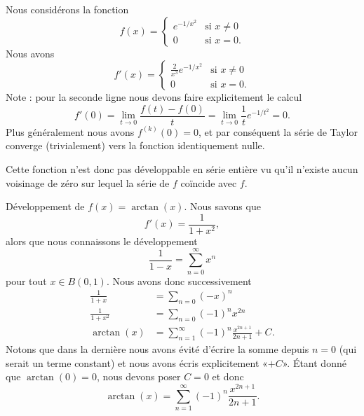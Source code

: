 \begin{example}
    Nous considérons la fonction
    \begin{equation}
        f(x)=\begin{cases}
            e^{-1/x^2}    &   \text{si } x\neq 0\\
            0    &    \text{si } x=0\text{.}
        \end{cases}
    \end{equation}
    Nous avons
    \begin{equation}
        f'(x)=\begin{cases}
            \frac{ 2 }{ x^3 } e^{-1/x^2}    &   \text{si } x\neq 0\\
            0    &    \text{si } x=0.
        \end{cases}
    \end{equation}
    Note : pour la seconde ligne nous devons faire explicitement le calcul
    \begin{equation}
        f'(0)=\lim_{t\to 0} \frac{ f(t)-f(0) }{ t }=\lim_{t\to 0} \frac{1}{ t } e^{-1/t^2}=0.
    \end{equation}
    Plus généralement nous avons \( f^{(k)}(0)=0\), et par conséquent la série de Taylor converge (trivialement) vers la fonction identiquement nulle.

    Cette fonction n'est donc pas développable en série entière vu qu'il n'existe aucun voisinage de zéro sur lequel la série de \( f\) coïncide avec \( f\).
\end{example}

\begin{example}     \label{ExwobBAW}
    Développement de \( f(x)=\arctan(x)\). Nous savons que
    \begin{equation}
        f'(x)=\frac{1}{ 1+x^2 },
    \end{equation}
    alors que nous connaissons le développement
    \begin{equation}    \label{EqVmuaqT}
        \frac{1}{ 1-x }=\sum_{n=0}^{\infty}x^n
    \end{equation}
    pour tout \( x\in B(0,1)\). Nous avons donc successivement
    \begin{subequations}
        \begin{align}
            \frac{1}{ 1+x }&=\sum_{n=0}(-x)^n\\
            \frac{ 1 }{ 1+x^2 }&=\sum_{n=0}(-1)^nx^{2n}\\
            \arctan(x)&=\sum_{n=1}^{\infty}(-1)^n\frac{ x^{2n+1} }{ 2n+1 }+C.
        \end{align}
    \end{subequations}
    Notons que dans la dernière nous avons évité d'écrire la somme depuis \( n=0\) (qui serait un terme constant) et nous avons écris explicitement «\( +C\)». Étant donné que \( \arctan(0)=0\), nous devons poser \( C=0\) et donc
    \begin{equation}
        \arctan(x)=\sum_{n=1}^{\infty}(-1)^n\frac{ x^{2n+1} }{ 2n+1 }.
    \end{equation}
\end{example}

